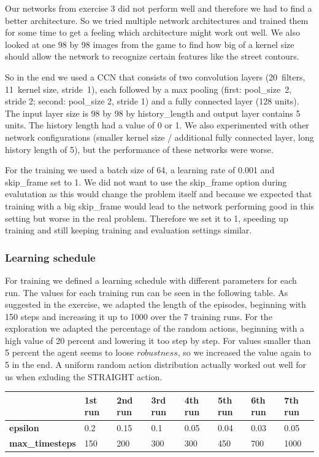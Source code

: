 \documentclass[
        a4paper,
        10pt,
        parskip = full,    %
    ]{scrartcl}
\begin{document}
Our networks from exercise 3 did not perform well and therefore we had to find a
better architecture. So we tried multiple network architectures and trained
them for some time to get a feeling which architecture might work out well. We also
looked at one 98 by 98 images from the game to find how big of a kernel size
should allow the network to recognize certain features like the street contours.

So in the end we used a CCN that consists of two convolution layers (20~filters,
11~kernel size, stride~1), each followed by a max pooling (first: pool\_size~2,
stride 2; second: pool\_size 2, stride 1) and a fully connected layer (128 units).
The input layer size is 98 by 98 by history\_length and output layer contains 5 units.
The history length had a value of 0 or 1. We also experimented with other network
configurations (smaller kernel size / additional fully connected layer, long history
length of 5), but the performance of these networks were worse.

For the training we used a batch size of 64, a learning rate of 0.001 and
skip\_frame set to 1. We did not want to use the skip\_frame option during evalutation
as this would change the problem itself and because we expected that training with a
big skip\_frame would lead to the network performing good in this setting but worse
in the real problem. Therefore we set it to 1, speeding up training and still keeping
training and evaluation settings similar.

\subsubsection{Learning schedule}

For training we defined a learning schedule with different parameters for each run. The values for
each training run can be seen in the following table. As suggested in the exercise, we adapted
the length of the episodes, beginning with 150 steps and increasing it up to 1000 over the 7 training runs.
For the exploration we adapted the percentage of the random actions, beginning with a high value of
20 percent and lowering it too step by step. For values smaller than 5 percent the agent seems to loose
$robustness$, so we increased the value again to 5 in the end. A uniform random action distribution actually
worked out well for us when exluding the STRAIGHT action.

\begin{center}
  \begin{tabular}{ | l | l | l | l | l | l | l | l |}
    \hline
    & \textbf{1st run} & \textbf{2nd run} & \textbf{3rd run} &
    \textbf{4th run} & \textbf{5th run} & \textbf{6th run} & \textbf{7th run} \\ \hline
    \textbf{epsilon}        &  0.2  &  0.15  &  0.1  &  0.05  &  0.04  &  0.03  &  0.05  \\ \hline
    \textbf{max\_timesteps} &  150  &  200   &  300  &  300   &  450   &  700   &  1000  \\ \hline
  \end{tabular}
\end{center}
\end{document}
